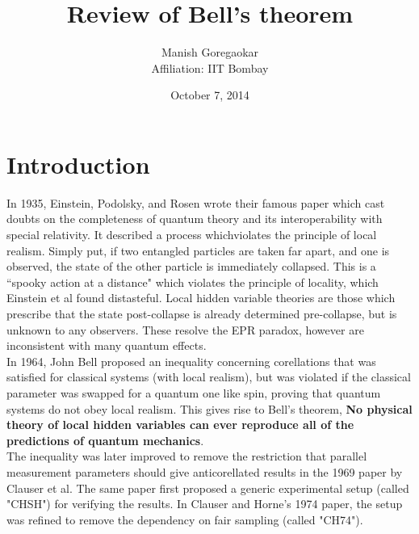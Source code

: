 \documentclass[10pt, twocolumn]{article}
\begin{document}
\title{Review of Bell's theorem}
\author{Manish Goregaokar\\\small Affiliation: IIT Bombay}
\date{October 7, 2014}
\maketitle
{}
\setcounter{tocdepth}{2}
\tableofcontents
\section{Introduction}
In 1935, Einstein, Podolsky, and Rosen wrote their famous paper\cite{epr} which cast doubts on the completeness of quantum theory and its interoperability with special relativity. It described a process whichviolates the principle of local realism. Simply put, if two entangled particles are taken far apart, and one is observed, the state of the other particle is immediately collapsed. This is a ``spooky action at a distance" which violates the principle of locality, which Einstein et al found distasteful. Local hidden variable theories are those which prescribe that the state post-collapse is already determined pre-collapse, but is unknown to any observers. These resolve the EPR paradox, however are inconsistent with many quantum effects.\\

In 1964, John Bell proposed\cite{bell} an inequality concerning corellations that was satisfied for classical systems (with local realism), but was violated if the classical parameter was swapped for a quantum one like spin, proving that quantum systems do not obey local realism. This gives rise to Bell's theorem, \textbf{No physical theory of local hidden variables can ever reproduce all of the predictions of quantum mechanics}.\\
The inequality was later improved to remove the restriction that parallel measurement parameters should give anticorellated results in the 1969 paper\cite{chsh} by Clauser et al. The same paper first proposed a generic experimental setup (called "CHSH") for verifying the results. In Clauser and Horne's 1974 paper\cite{ch74}, the setup was refined to remove the dependency on fair sampling (called "CH74").\\
\end{document}
